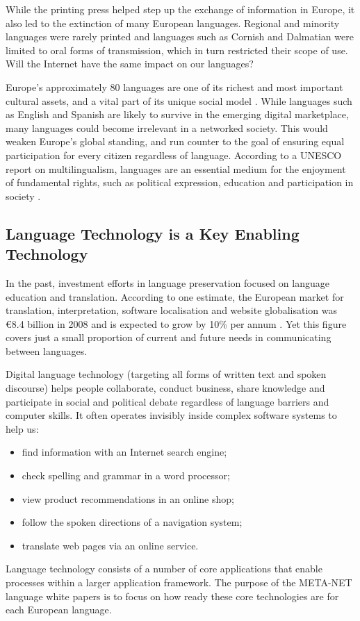 \begin{multicols}{2}
    While the printing press helped step up the exchange of information in Europe, it also led to the extinction of many European languages. Regional and minority languages were rarely printed and languages such as Cornish and Dalmatian were limited to oral forms of transmission, which in turn restricted their scope of use. Will the Internet have the same impact on our languages?


    Europe’s approximately 80 languages are one of its richest and most important cultural assets, and a vital part of its unique social model \cite{CAT-Nota2}. While languages such as English and Spanish are likely to survive in the emerging digital marketplace, many languages could become irrelevant in a networked society. This would weaken Europe’s global standing, and run counter to the goal of ensuring equal participation for every citizen regardless of language. According to a UNESCO report on multilingualism, languages are an essential medium for the enjoyment of fundamental rights, such as political expression, education and participation in society \cite{CAT-Nota3}.

\subsection{Language Technology is a Key Enabling Technology}

    In the past, investment efforts in language preservation focused on language education and translation. According to one estimate, the European market for translation, interpretation, software localisation and website globalisation was €8.4 billion in 2008 and is expected to grow by 10\% per annum \cite{CAT-Nota3}. Yet this figure covers just a small proportion of current and future needs in communicating between languages. 

    Digital language technology (targeting all forms of written text and spoken discourse) helps people collaborate, conduct business, share knowledge and participate in social and political debate regardless of language barriers and computer skills. It often operates invisibly inside complex software systems to help us:
    \begin{itemize}
      \item find information with an Internet search engine;
      \item check spelling and grammar in a word processor;
      \item view product recommendations in an online shop;
      \item follow the spoken directions of a navigation system;
      \item translate web pages via an online service.
    \end{itemize}
    Language technology consists of a number of core applications that enable processes within a larger application framework. The purpose of the META-NET language white papers is to focus on how ready these core technologies are for each European language. 


\end{multicols}
